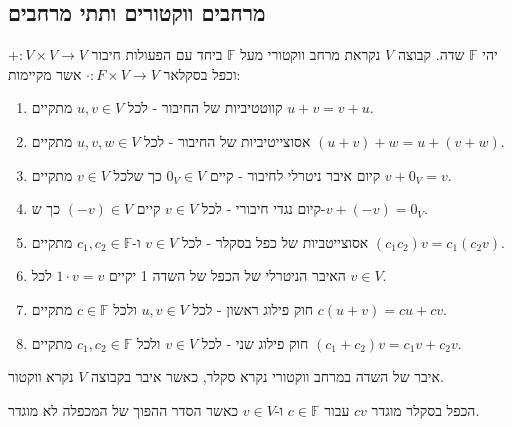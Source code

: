 \documentclass{tstextbook}
\begin{document}
\subsection{מרחבים ווקטורים ותתי מרחבים}

\begin{definition}
יהי \(\mathbb{F}\) שדה. קבוצה \(V\) נקראת מרחב ווקטורי מעל \(\mathbb{F}\) ביחד עם הפעולות חיבור \(+:V\times V\to V\) וכפל בסקלאר \(\cdot:F\times V\to V\) אשר מקיימות:

  \begin{enumerate}
    \item קווטטיביות  של החיבור - לכל \(u,v \in V\) מתקיים \(u+v=v+u\). 


    \item אסוצייטיביות של החיבור - לכל \(u,v,w \in V\) מתקיים \((u+v)+w=u+(v+w)\). 


    \item קיום איבר ניטרלי לחיבור -  קיים \(0_{V}\in V\) כך שלכל \(v \in V\) מתקיים \(v+0_{V}=v\). 


    \item קיום נגדי חיבורי - לכל \(v \in V\) קיים \((-v) \in V\) כך ש-\(v+(-v)=0_{V}\). 


    \item אסוצייטביות של כפל בסקלר - לכל \(v \in V\) ו-\(c_{1},c_{2} \in \mathbb{F}\) מתקיים \((c_{1}c_{2})v=c_{1}(c_{2}v)\). 


    \item האיבר הניטרלי של הכפל של השדה 1 יקיים \(1\cdot v=v\) לכל \(v \in V\). 


    \item חוק פילוג ראשון - לכל \(u,v \in V\) ולכל \(c \in \mathbb{F}\) מתקיים \(c(u+v)=cu+cv\). 


    \item חוק פילוג שני - לכל \(v \in V\) ולכל \(c_{1},c_{2} \in \mathbb{F}\) מתקיים \((c_{1}+c_{2})v=c_{1}v+c_{2}v\). 


  \end{enumerate}
\end{definition}
\begin{symbolize}
איבר של השדה במרחב ווקטורי נקרא סקלר, כאשר איבר בקבוצה \(V\) נקרא ווקטור.

\end{symbolize}
\begin{remark}
הכפל בסקלר מוגדר \(cv\) עבור \(c \in \mathbb{F}\) ו-\(v \in V\) כאשר הסדר ההפוך של המכפלה לא מוגדר.

\end{remark}
\end{document}
